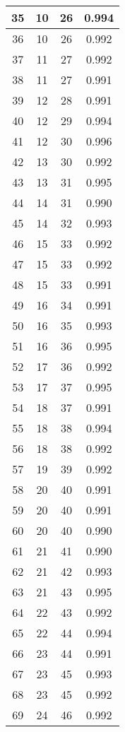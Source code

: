 \begin{table}
\begin{tabular}{|c|c|c|c|}
 35  & 10  & 26 & 0.994  \\ \hline
 36  & 10  & 26 & 0.992  \\ \hline
 37  & 11  & 27 & 0.992  \\ \hline
 38  & 11  & 27 & 0.991  \\ \hline
 39  & 12  & 28 & 0.991  \\ \hline
 40  & 12  & 29 & 0.994  \\ \hline
 41  & 12  & 30 & 0.996  \\ \hline
 42  & 13  & 30 & 0.992  \\ \hline
 43  & 13  & 31 & 0.995  \\ \hline
 44  & 14  & 31 & 0.990  \\ \hline
 45  & 14  & 32 & 0.993  \\ \hline
 46  & 15  & 33 & 0.992  \\ \hline
 47  & 15  & 33 & 0.992  \\ \hline
 48  & 15  & 33 & 0.991  \\ \hline
 49  & 16  & 34 & 0.991  \\ \hline
 50  & 16  & 35 & 0.993  \\ \hline
 51  & 16  & 36 & 0.995  \\ \hline
 52  & 17  & 36 & 0.992  \\ \hline
 53  & 17  & 37 & 0.995  \\ \hline
 54  & 18  & 37 & 0.991  \\ \hline
 55  & 18  & 38 & 0.994  \\ \hline
 56  & 18  & 38 & 0.992  \\ \hline
 57  & 19  & 39 & 0.992  \\ \hline
 58  & 20  & 40 & 0.991  \\ \hline
 59  & 20  & 40 & 0.991  \\ \hline
 60  & 20  & 40 & 0.990  \\ \hline
 61  & 21  & 41 & 0.990  \\ \hline
 62  & 21  & 42 & 0.993  \\ \hline
 63  & 21  & 43 & 0.995  \\ \hline
 64  & 22  & 43 & 0.992  \\ \hline
 65  & 22  & 44 & 0.994  \\ \hline
 66  & 23  & 44 & 0.991  \\ \hline
 67  & 23  & 45 & 0.993  \\ \hline
 68  & 23  & 45 & 0.992  \\ \hline
 69  & 24  & 46 & 0.992  \\ \hline

\end{tabular}
\end{table}
